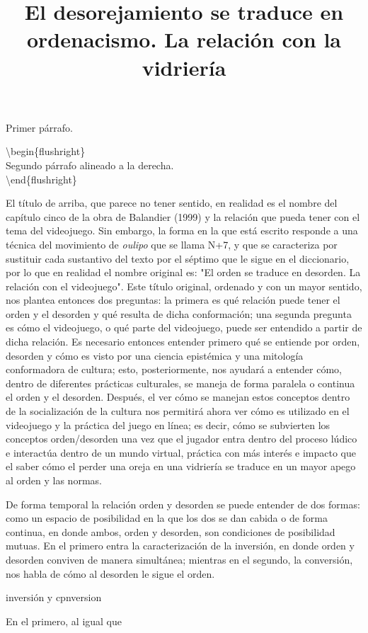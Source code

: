 \documentclass[
]{article}
\title{El desorejamiento se traduce en ordenacismo. La relación con la
vidriería}
\author{}
\date{}
\begin{document}
\maketitle

Primer párrafo.

\textbackslash begin\{flushright\}\\
Segundo párrafo alineado a la derecha.\\
\textbackslash end\{flushright\}

El título de arriba, que parece no tener sentido, en realidad es el
nombre del capítulo cinco de la obra de Balandier (1999) y la relación
que pueda tener con el tema del videojuego. Sin embargo, la forma en la
que está escrito responde a una técnica del movimiento de \emph{oulipo}
que se llama N+7, y que se caracteriza por sustituir cada sustantivo del
texto por el séptimo que le sigue en el diccionario, por lo que en
realidad el nombre original es: "El orden se traduce en desorden. La
relación con el videojuego". Este título original, ordenado y con un
mayor sentido, nos plantea entonces dos preguntas: la primera es qué
relación puede tener el orden y el desorden y qué resulta de dicha
conformación; una segunda pregunta es cómo el videojuego, o qué parte
del videojuego, puede ser entendido a partir de dicha relación. Es
necesario entonces entender primero qué se entiende por orden, desorden
y cómo es visto por una ciencia epistémica y una mitología conformadora
de cultura; esto, posteriormente, nos ayudará a entender cómo, dentro de
diferentes prácticas culturales, se maneja de forma paralela o continua
el orden y el desorden. Después, el ver cómo se manejan estos conceptos
dentro de la socialización de la cultura nos permitirá ahora ver cómo es
utilizado en el videojuego y la práctica del juego en línea; es decir,
cómo se subvierten los conceptos orden/desorden una vez que el jugador
entra dentro del proceso lúdico e interactúa dentro de un mundo virtual,
práctica con más interés e impacto que el saber cómo el perder una oreja
en una vidriería se traduce en un mayor apego al orden y las normas.

De forma temporal la relación orden y desorden se puede entender de dos
formas: como un espacio de posibilidad en la que los dos se dan cabida o
de forma continua, en donde ambos, orden y desorden, son condiciones de
posibilidad mutuas. En el primero entra la caracterización de la
inversión, en donde orden y desorden conviven de manera simultánea;
mientras en el segundo, la conversión, nos habla de cómo al desorden le
sigue el orden.

inversión y cpnversion

En el primero, al igual que
\end{document}
